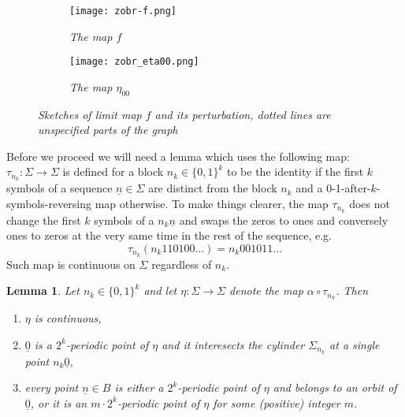\documentclass{amsart}
\newtheorem{lemma}{Lemma}
\begin{document}
\begin{figure}
\begin{subfigure}{0.495\textwidth}
\centering
\texttt{[image: zobr-f.png]}
\caption{\sl The map $f$}
\end{subfigure}
\begin{subfigure}{0.495\textwidth}
\centering
\texttt{[image: zobr\_eta00.png]}
\caption{\sl The map $\eta_{00}$}
\end{subfigure}
\caption{\sl Sketches of limit map $f$ and its perturbation, dotted lines are unspecified parts of the graph}
\end{figure}

Before we proceed we will need a lemma which uses the following map: $\tau_{n_k}\!: \Sigma \rightarrow \Sigma$ is defined for a block $n_k \in \{0,1\}^k$ to be the identity if the first $k$ symbols of a sequence $\underline{n}\in\Sigma$ are distinct from the block $n_k$ and a 0-1-after-$k$-symbols-reversing map otherwise. To make things clearer, the map $\tau_{n_k}$ does not change the first $k$ symbols of a $n_k\underline{n}$ and swaps the zeros to ones and conversely ones to zeros at the very same time in the rest of the sequence, e.g. $$\tau_{n_k}(n_k110100\ldots) = n_k001011\ldots$$ Such map is continuous on $\Sigma$ regardless of $n_k$.

\begin{lemma}\label{lm}
Let $n_k\in\{0,1\}^k$ and let $\eta\!: \Sigma \rightarrow \Sigma$ denote the map $\alpha\circ\tau_{n_k}$. Then
\begin{enumerate}
\item $\eta$ is continuous,
\item $\underline{0}$ is a $2^k$-periodic point of $\eta$ and it interesects the cylinder $\Sigma_{n_k}$ at a single point $n_k\underline{0}$,
\item every point $\underline{n} \in B$ is either a $2^k$-periodic point of $\eta$ and belongs to an orbit of $\underline{0}$, or it is an $m\cdot2^k$-periodic point of $\eta$ for some (positive) integer $m$.
\end{enumerate}
\end{lemma}
\end{document}

